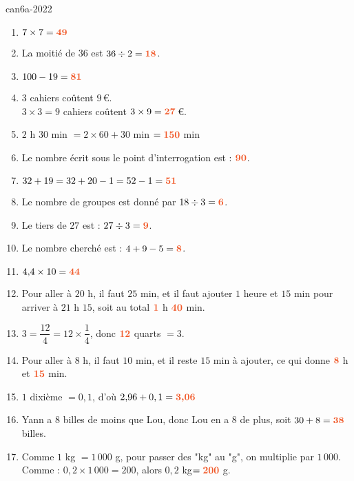 \begin{EXO}{}{can6a-2022}
    
\begin{enumerate}[itemsep=1em, label=\arabic*)]
\item $7 \times 7={\color[HTML]{f15929}\boldsymbol{49}}$
\item La moitié de $36$ est $36\div 2={\color[HTML]{f15929}\boldsymbol{18}}$.
\item $100-19={\color[HTML]{f15929}\boldsymbol{81}}$
\item $3$ cahiers coûtent $9$\,\euro{}.\\ 			$3\times3=9$ cahiers coûtent $3\times9={\color[HTML]{f15929}\boldsymbol{27}}$\,\euro{}.
\item $2$ h $30$ min $=2\times 60+ 30$ min $={\color[HTML]{f15929}\boldsymbol{150}}$ min
\item Le nombre écrit sous le point d'interrogation est : ${\color[HTML]{f15929}\boldsymbol{90}}$.
\item $32+19=32+20-1=52-1={\color[HTML]{f15929}\boldsymbol{51}}$
\item Le nombre de groupes est donné par $18\div 3={\color[HTML]{f15929}\boldsymbol{6}}$.
\item Le tiers de $27$ est : $27\div 3={\color[HTML]{f15929}\boldsymbol{9}}$.
\item Le nombre cherché est : $4+9-5={\color[HTML]{f15929}\boldsymbol{8}}$.
\item $4{,}4\times 10={\color[HTML]{f15929}\boldsymbol{44}}$ 
\item Pour aller à $20$ h, il faut $25$ min, et il faut ajouter $1$ heure et $15$ min pour arriver à $21$ h $15$, soit au total ${\color[HTML]{f15929}\boldsymbol{1}}$ h ${\color[HTML]{f15929}\boldsymbol{40}}$ min.
\item $3=\dfrac{12}{4}=12\times \dfrac{1}{4}$, donc ${\color[HTML]{f15929}\boldsymbol{12}}$ quarts $=3$. 
\item Pour aller à $8$ h, il faut $10$ min, et il reste $15$ min à ajouter, ce qui donne ${\color[HTML]{f15929}\boldsymbol{8}}$ h et ${\color[HTML]{f15929}\boldsymbol{15}}$ min.
\item $1$ dixième $=0,1$, d'où $2{,}96+0,1 ={\color[HTML]{f15929}\boldsymbol{3{,}06}}$
\item Yann a $8$ billes de moins que Lou, donc Lou en a $8$ de plus, soit $30+8={\color[HTML]{f15929}\boldsymbol{38}}$ billes.
\item  Comme $1$ kg $=1\,000$ g,  pour passer des "kg" au "g", on multiplie par $1\,000$.\\ 			Comme : $0{,}2\times 1\,000 =200$, alors $0{,}2$ kg$={\color[HTML]{f15929}\boldsymbol{200}}$ g.

\end{enumerate}
\end{EXO}
